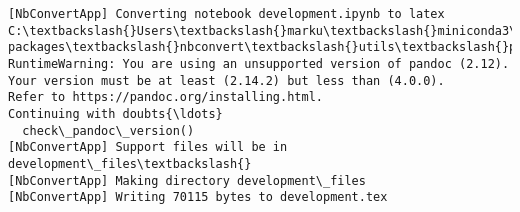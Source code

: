 \documentclass[11pt]{article}
\begin{document}
    \begin{Verbatim}[commandchars=\\\{\}]
[NbConvertApp] Converting notebook development.ipynb to latex
C:\textbackslash{}Users\textbackslash{}marku\textbackslash{}miniconda3\textbackslash{}Lib\textbackslash{}site-packages\textbackslash{}nbconvert\textbackslash{}utils\textbackslash{}pandoc.py:51:
RuntimeWarning: You are using an unsupported version of pandoc (2.12).
Your version must be at least (2.14.2) but less than (4.0.0).
Refer to https://pandoc.org/installing.html.
Continuing with doubts{\ldots}
  check\_pandoc\_version()
[NbConvertApp] Support files will be in development\_files\textbackslash{}
[NbConvertApp] Making directory development\_files
[NbConvertApp] Writing 70115 bytes to development.tex
    \end{Verbatim}


    
    
    
\end{document}

